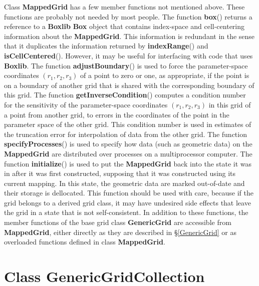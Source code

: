 \documentclass{article}
\newcommand{\Index}[1]{#1\index{#1}}
\begin{document}
Class \textbf{MappedGrid} has a few member functions not mentioned above.  These functions are probably not needed by most people.
The function \textbf{box}() returns a reference to a \textbf{Boxlib} \textbf{Box} object that contains index-space
and cell-centering information about the \textbf{MappedGrid}.  This information is redundant in the sense that it duplicates the
information returned by \textbf{indexRange}() and \textbf{isCellCentered}().  However, it may be useful for interfacing with
code that uses \textbf{Boxlib}.  The function \textbf{adjustBoundary}() is used to force the parameter-space coordinates
$(r_1,r_2,r_3)$ of a point to zero or one, as appropriate, if the point is on a boundary of another grid that is shared with the
corresponding boundary of this grid.  The function \textbf{getInverseCondition}() computes a condition number for the sensitivity
of the parameter-space coordinates $(r_1,r_2,r_3)$ in this grid of a point from another grid, to errors in the coordinates of the
point in the parameter space of the other grid.  This condition number is used in estimates of the truncation error for interpolation
of data from the other grid.  The function \textbf{specifyProcesses}() is used to specify how data (such as geometric data) on the
\textbf{MappedGrid} are distributed over processes on a multiprocessor computer.  The function \textbf{initialize}() is used
to put the \textbf{MappedGrid} back into the state it was in after it was first constructed, supposing that it was constructed using
its current mapping.  In this state, the geometric data are marked out-of-date and their storage is dellocated.  This function should be
used with care, because if the grid belongs to a derived grid class, it may have undesired side effects that leave the grid in a state that
is not self-consistent.  In addition to these functions, the member functions of the base grid class \textbf{GenericGrid} are
accessible from \textbf{MappedGrid}, either directly as they are described in \S\ref{GenericGrid} or as overloaded functions defined
in class \textbf{MappedGrid}.

\section{Class \textbf{\Index{GenericGridCollection}}}
\label{GenericGridCollection}
\end{document}
